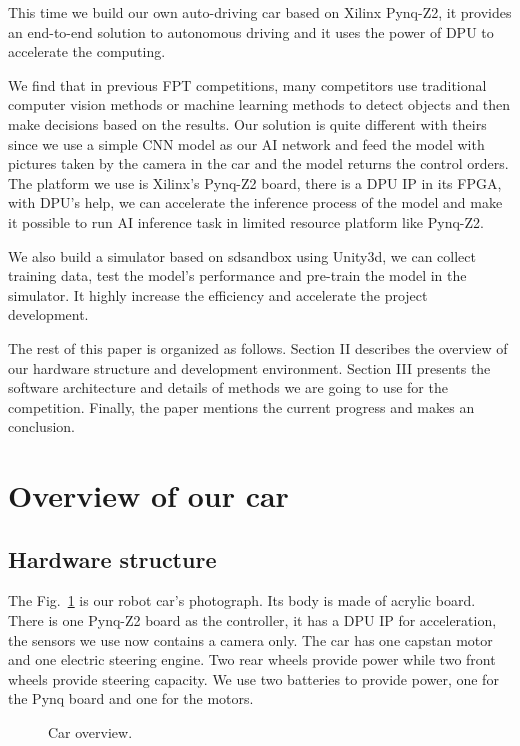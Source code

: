 \documentclass[conference]{IEEEtran}
\begin{document}
This time we build our own auto-driving car based on Xilinx Pynq-Z2\cite{b4}, it provides an end-to-end solution to autonomous driving and it uses the power of DPU\cite{b5} to accelerate the computing. 

We find that in previous FPT competitions\cite{b6}, many competitors use traditional computer vision methods or machine learning methods to detect objects and then make decisions based on the results\cite{b7}\cite{b8}. Our solution is quite different with theirs since we use a simple CNN model as our AI network and feed the model with pictures taken by the camera in the car and the model returns the control orders.
The platform we use is Xilinx’s Pynq-Z2 board, there is a DPU IP in its FPGA, with DPU’s help, we can accelerate the inference process of the model and make it possible to run AI inference task in limited resource platform like Pynq-Z2. 

We also build a simulator based on sdsandbox\cite{b9} using Unity3d\cite{b10}, we can collect training data, test the model's performance and pre-train the model in the simulator. It highly increase the efficiency and accelerate the project development. 

The rest of this paper is organized as follows. Section II describes the overview of our hardware structure and development environment. Section III presents the software architecture and details of methods we are going to use for the competition. Finally, the paper mentions the current progress and makes an conclusion.

\section{Overview of our car}

\subsection{Hardware structure}

The Fig.~\ref{co} is our robot car's photograph. Its body is made of acrylic board. There is one Pynq-Z2 board as the controller, it has a DPU IP for acceleration, the sensors we use now contains a camera only. The car has one capstan motor and one electric steering engine. Two rear wheels provide power while two front wheels provide steering capacity. We use two batteries to provide power, one for the Pynq board and one for the motors.

\begin{figure}[htbp]
\caption{Car overview.}
\label{co}
\end{figure}
\end{document}

